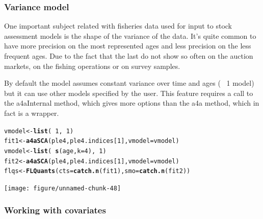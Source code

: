 \documentclass[a4paper,english,10pt]{article}\usepackage[]{graphicx}\usepackage[]{color}
\makeatletter
\newcommand{\hlnum}[1]{\textcolor[rgb]{0.686,0.059,0.569}{#1}}%
\newcommand{\hlopt}[1]{\textcolor[rgb]{0,0,0}{#1}}%
\newcommand{\hlstd}[1]{\textcolor[rgb]{0.345,0.345,0.345}{#1}}%
\newcommand{\hlkwb}[1]{\textcolor[rgb]{0.69,0.353,0.396}{#1}}%
\newcommand{\hlkwc}[1]{\textcolor[rgb]{0.333,0.667,0.333}{#1}}%
\newcommand{\hlkwd}[1]{\textcolor[rgb]{0.737,0.353,0.396}{\textbf{#1}}}%
\newenvironment{kframe}{%
 \def\at@end@of@kframe{}%
 \ifinner\ifhmode%
  \def\at@end@of@kframe{\end{minipage}}%
  \begin{minipage}{\columnwidth}%
 \fi\fi%
 \def\FrameCommand##1{\hskip\@totalleftmargin \hskip-\fboxsep
 \colorbox{shadecolor}{##1}\hskip-\fboxsep
     \hskip-\linewidth \hskip-\@totalleftmargin \hskip\columnwidth}%
 \MakeFramed {\advance\hsize-\width
   \@totalleftmargin\z@ \linewidth\hsize
   \@setminipage}}%
 {\par\unskip\endMakeFramed%
 \at@end@of@kframe}
\newenvironment{knitrout}{}{} %
\makeatother
\begin{document}
\subsubsection{Variance model}

One important subject related with fisheries data used for input to stock assessment models is the shape of the variance of the data. It's quite common to have more precision on the most represented ages and less precision on the less frequent ages. Due to the fact that the last do not show so often on the auction markets, on the fishing operations or on survey samples.

By default the model assumes constant variance over time and ages (~ 1 model) but it can use other models specified by the user. This feature requires a call to the a4aInternal method, which gives more options than the a4a method, which in fact is a wrapper.

\begin{knitrout}
\color{fgcolor}\begin{kframe}
\begin{alltt}
\hlstd{vmodel} \hlkwb{<-} \hlkwd{list}\hlstd{(}\hlopt{~}\hlnum{1}\hlstd{,} \hlopt{~}\hlnum{1}\hlstd{)}
\hlstd{fit1} \hlkwb{<-} \hlkwd{a4aSCA}\hlstd{(ple4, ple4.indices[}\hlnum{1}\hlstd{],} \hlkwc{vmodel} \hlstd{= vmodel)}
\hlstd{vmodel} \hlkwb{<-} \hlkwd{list}\hlstd{(}\hlopt{~}\hlkwd{s}\hlstd{(age,} \hlkwc{k} \hlstd{=} \hlnum{4}\hlstd{),} \hlopt{~}\hlnum{1}\hlstd{)}
\hlstd{fit2} \hlkwb{<-} \hlkwd{a4aSCA}\hlstd{(ple4, ple4.indices[}\hlnum{1}\hlstd{],} \hlkwc{vmodel} \hlstd{= vmodel)}
\hlstd{flqs} \hlkwb{<-} \hlkwd{FLQuants}\hlstd{(}\hlkwc{cts} \hlstd{=} \hlkwd{catch.n}\hlstd{(fit1),} \hlkwc{smo} \hlstd{=} \hlkwd{catch.n}\hlstd{(fit2))}
\end{alltt}
\end{kframe}
\end{knitrout}


\begin{knitrout}
\color{fgcolor}

{\centering \texttt{[image: figure/unnamed-chunk-48]} 

}



\end{knitrout}


\subsubsection{Working with covariates}
\end{document}
